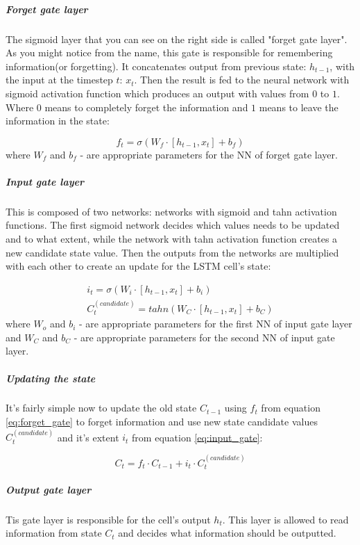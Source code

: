 \subparagraph{Forget gate layer}
The sigmoid layer that you can see on the right side is
called "forget gate layer". As you might notice from the name, this gate is responsible
for remembering information(or forgetting). It concatenates output from previous state: $h_{t-1}$,
with the input at the timestep $t$: $x_t$. Then the result is fed to the neural network
with sigmoid activation function which produces an output with values from $0$ to $1$.
Where 0 means to completely forget the information and $1$ means to leave
the information in the state:

\begin{equation} \label{eq:forget_gate}
	f_t = \sigma (W_f \cdot [h_{t-1}, x_t] + b_f)
\end{equation}
where $W_f$ and $b_f$ - are appropriate parameters for the NN of forget gate layer.

\subparagraph{Input gate layer} This is composed of two networks: networks with sigmoid
and tahn activation functions. The first sigmoid network decides which values needs
to be updated and to what extent, while the network with tahn activation function creates a
new candidate state value. Then the outputs from the networks are multiplied with each other
to create an update for the LSTM cell's state:

\begin{align} \label{eq:input_gate}
	i_t = \sigma (W_i \cdot [h_{t-1}, x_t] + b_i) \nonumber\\
	C_t^{(candidate)} = tahn(W_C \cdot [h_{t-1}, x_t] + b_C)
\end{align}
where $W_o$ and $b_i$ - are appropriate parameters for the first NN of input gate layer
and $W_C$ and $b_C$ - are appropriate parameters for the second NN of input gate layer.

\subparagraph{Updating the state}
It's fairly simple now to update the old state $C_{t-1}$ using $f_t$ from equation
\ref{eq:forget_gate} to forget information and use new state candidate values
$C_t^{(candidate)}$ and it's extent $i_t$ from equation \ref{eq:input_gate}:

\begin{equation} \label{eq:update_state}
	C_t = f_t \cdot C_{t-1} + i_t \cdot C_t^{(candidate)}
\end{equation}

\subparagraph{Output gate layer} Tis gate layer is responsible for the cell's output $h_t$.
This layer is allowed to read information from state $C_t$ and decides what information
should be outputted.

